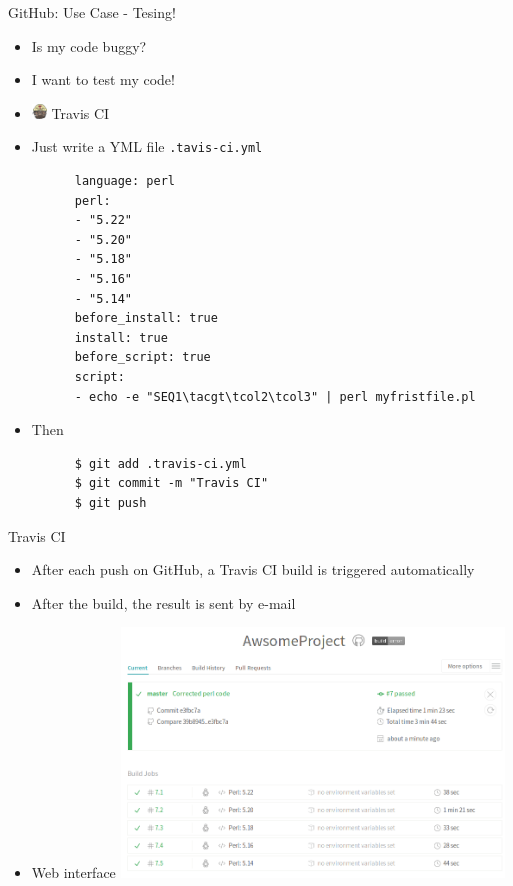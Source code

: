 \begin{frame}[fragile]{GitHub: Use Case - Tesing!}
  \begin{itemize}
  \item<1-> Is my code buggy?
  \item<2-> I want to test my code!
  \item<3-> \includegraphics[width=15px]{images/Travis_CI_Logo.png} Travis CI
  \item<4-> Just write a YML file \verb+.tavis-ci.yml+
    \begin{lstlisting}
      language: perl
      perl:
      - "5.22"
      - "5.20"
      - "5.18"
      - "5.16"
      - "5.14"
      before_install: true
      install: true
      before_script: true
      script:
      - echo -e "SEQ1\tacgt\tcol2\tcol3" | perl myfristfile.pl
    \end{lstlisting}
  \item<5-> Then
    \begin{lstlisting}
      $ git add .travis-ci.yml
      $ git commit -m "Travis CI"
      $ git push
    \end{lstlisting}
  \end{itemize}
\end{frame}



\begin{frame}[fragile]{Travis CI}
  \begin{itemize}
  \item After each push on GitHub, a Travis CI build is triggered automatically
  \item After the build, the result is sent by e-mail
  \item Web interface
    \includegraphics[width=0.8\textwidth]{images/hosting_services_use_case_10.png}
  \end{itemize}
\end{frame}

